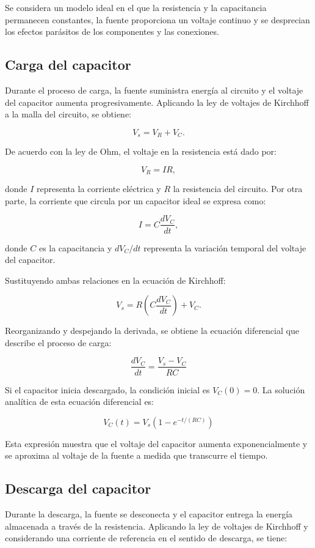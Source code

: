 \documentclass[11pt,a4paper]{article}
\begin{document}
Se considera un modelo ideal en el que la resistencia y la
capacitancia permanecen constantes, la fuente proporciona un
voltaje continuo y se desprecian los efectos parásitos de los
componentes y las conexiones.

\subsection{Carga del capacitor}

Durante el proceso de carga, la fuente suministra energía al
circuito y el voltaje del capacitor aumenta progresivamente.
Aplicando la ley de voltajes de Kirchhoff a la malla del circuito,
se obtiene:

\[
V_s=V_R+V_C.
\]

De acuerdo con la ley de Ohm, el voltaje en la resistencia está
dado por:

\[
V_R=IR,
\]

donde $I$ representa la corriente eléctrica y $R$ la resistencia
del circuito. Por otra parte, la corriente que circula por un
capacitor ideal se expresa como:

\[
I=C\frac{dV_C}{dt},
\]

donde $C$ es la capacitancia y $dV_C/dt$ representa la variación
temporal del voltaje del capacitor.

Sustituyendo ambas relaciones en la ecuación de Kirchhoff:

\[
V_s=R\left(C\frac{dV_C}{dt}\right)+V_C.
\]

Reorganizando y despejando la derivada, se obtiene la ecuación
diferencial que describe el proceso de carga:

\[
\boxed{
\frac{dV_C}{dt}=\frac{V_s-V_C}{RC}
}
\]

Si el capacitor inicia descargado, la condición inicial es
$V_C(0)=0$. La solución analítica de esta ecuación diferencial es:

\[
\boxed{
V_C(t)=V_s\left(1-e^{-t/(RC)}\right)
}
\]

Esta expresión muestra que el voltaje del capacitor aumenta
exponencialmente y se aproxima al voltaje de la fuente a medida
que transcurre el tiempo.

\subsection{Descarga del capacitor}

Durante la descarga, la fuente se desconecta y el capacitor
entrega la energía almacenada a través de la resistencia. Aplicando
la ley de voltajes de Kirchhoff y considerando una corriente de
referencia en el sentido de descarga, se tiene:
\end{document}
